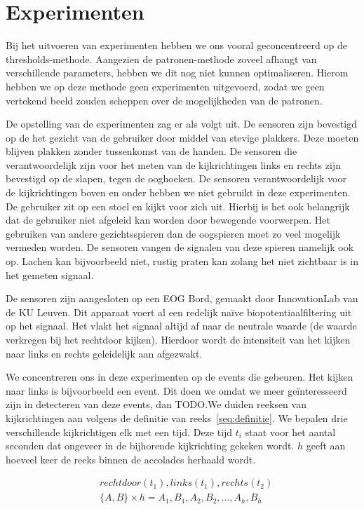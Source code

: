 \documentclass{article}
\begin{document}
\section{Experimenten}

Bij het uitvoeren van experimenten hebben we ons vooral geconcentreerd op de thresholds-methode. Aangezien de patronen-methode zoveel afhangt van verschillende parameters, hebben we dit nog niet kunnen optimaliseren. Hierom hebben we op deze methode geen experimenten uitgevoerd, zodat we geen vertekend beeld zouden scheppen over de mogelijkheden van de patronen.

De opstelling van de experimenten zag er als volgt uit. De sensoren zijn bevestigd op de het gezicht van de gebruiker door middel van stevige plakkers. Deze moeten blijven plakken zonder tussenkomst van de handen. De sensoren die verantwoordelijk zijn voor het meten van de kijkrichtingen links en rechts zijn bevestigd op de slapen, tegen de ooghoeken. De sensoren verantwoordelijk voor de kijkrichtingen boven en onder hebben we niet gebruikt in deze experimenten. De gebruiker zit op een stoel en kijkt voor zich uit. Hierbij is het ook belangrijk dat de gebruiker niet afgeleid kan worden door bewegende voorwerpen. Het gebruiken van andere gezichtsspieren dan de oogspieren moet zo veel mogelijk vermeden worden. De sensoren vangen de signalen van deze spieren namelijk ook op. Lachen kan bijvoorbeeld niet, rustig praten kan zolang het niet zichtbaar is in het gemeten signaal.

De sensoren zijn aangesloten op een EOG Bord, gemaakt door InnovationLab van de KU Leuven. Dit apparaat voert al een redelijk naïve biopotentiaalfiltering uit op het signaal. Het vlakt het signaal altijd af naar de neutrale waarde (de waarde verkregen bij het rechtdoor kijken). Hierdoor wordt de intensiteit van het kijken naar links en rechts geleidelijk aan afgezwakt.

We concentreren ons in deze experimenten op de events die gebeuren. Het kijken naar links is bijvoorbeeld een event. Dit doen we omdat we meer geïnteresseerd zijn in detecteren van deze events, dan TODO.We duiden reeksen van kijkrichtingen aan volgens de definitie van reeks~\ref{seq:definitie}. We bepalen drie verschillende kijkrichtigen elk met een tijd. Deze tijd $t_i$ staat voor het aantal seconden dat ongeveer in de bijhorende kijkrichting gekeken wordt. $h$ geeft aan hoeveel keer de reeks binnen de accolades herhaald wordt.

\begin{equation}
\label{seq:definitie}
\begin{aligned}
& rechtdoor(t_1),  links (t_1), rechts (t_2) \\
& \{ A, B\} \times h = A_1, B_1, A_2, B_2, ... , A_h, B_h
\end{aligned}
\end{equation}
\end{document}
